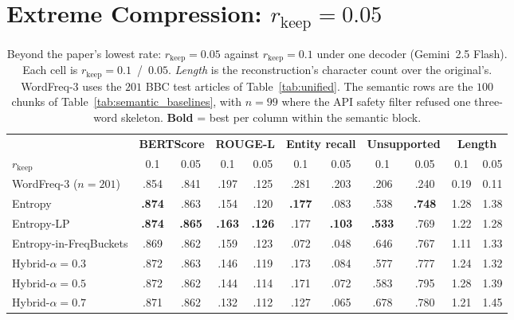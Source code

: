 \documentclass[11pt]{article}
\newcommand{\rkeep}{r_{\mathrm{keep}}}
\begin{document}
\section{Extreme Compression: $\rkeep = 0.05$}
\label{app:r005}
\begin{table}[tbp]
\centering
\small
\setlength{\tabcolsep}{4pt}
\caption{Beyond the paper's lowest rate: $\rkeep = 0.05$ against $\rkeep = 0.1$ under one decoder (Gemini~2.5 Flash). Each cell is $\rkeep{=}0.1$~/~$0.05$. \emph{Length} is the
reconstruction's character count over the original's. WordFreq-3 uses the $201$ BBC test articles of Table~\ref{tab:unified}. The semantic rows are the $100$ chunks of
Table~\ref{tab:semantic_baselines}, with $n{=}99$ where the API safety filter refused one three-word
skeleton. \textbf{Bold} = best per column within the semantic block.}
\label{tab:r005}
\begin{tabular}{l cc cc cc cc cc}
\toprule
& \multicolumn{2}{c}{\textbf{BERTScore}} & \multicolumn{2}{c}{\textbf{ROUGE-L}} & \multicolumn{2}{c}{\textbf{Entity recall}} & \multicolumn{2}{c}{\textbf{Unsupported}} & \multicolumn{2}{c}{\textbf{Length}} \\
\cmidrule(lr){2-3}\cmidrule(lr){4-5}\cmidrule(lr){6-7}\cmidrule(lr){8-9}\cmidrule(lr){10-11}
$\rkeep$ & 0.1 & 0.05 & 0.1 & 0.05 & 0.1 & 0.05 & 0.1 & 0.05 & 0.1 & 0.05 \\
\midrule
WordFreq-3 ($n{=}201$)     & .854 & .841 & .197 & .125 & .281 & .203 & .206 & .240 & 0.19 & 0.11 \\
\midrule
Entropy                    & \textbf{.874} & .863 & .154 & .120 & \textbf{.177} & .083 & .538 & \textbf{.748} & 1.28 & 1.38 \\
Entropy-LP                 & \textbf{.874} & \textbf{.865} & \textbf{.163} & \textbf{.126} & .177 & \textbf{.103} & \textbf{.533} & .769 & 1.22 & 1.28 \\
Entropy-in-FreqBuckets     & .869 & .862 & .159 & .123 & .072 & .048 & .646 & .767 & 1.11 & 1.33 \\
Hybrid-$\alpha{=}0.3$      & .872 & .863 & .146 & .119 & .173 & .084 & .577 & .777 & 1.24 & 1.32 \\
Hybrid-$\alpha{=}0.5$      & .872 & .862 & .144 & .114 & .171 & .072 & .583 & .795 & 1.28 & 1.39 \\
Hybrid-$\alpha{=}0.7$      & .871 & .862 & .132 & .112 & .127 & .065 & .678 & .780 & 1.21 & 1.45 \\
\bottomrule
\end{tabular}
\end{table}
\end{document}
